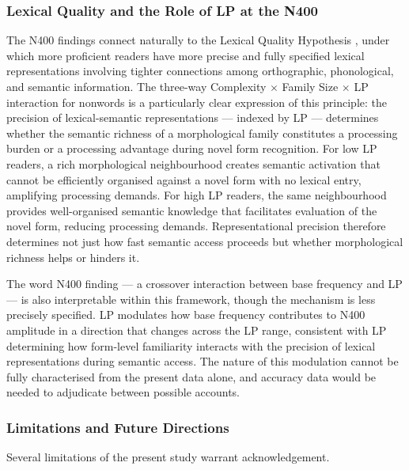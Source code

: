 \documentclass[utf8]{FrontiersinHarvard} %
\begin{document}
	\subsubsection{Lexical Quality and the Role of LP at the N400}
	
	The N400 findings connect naturally to the Lexical Quality Hypothesis \citep{perfettiReadingAbilityLexical2007}, under which more proficient readers have more precise and fully specified lexical representations involving tighter connections among orthographic, phonological, and semantic information. The three-way Complexity $\times$ Family Size $\times$ LP interaction for nonwords is a particularly clear expression of this principle: the precision of lexical-semantic representations --- indexed by LP --- determines whether the semantic richness of a morphological family constitutes a processing burden or a processing advantage during novel form recognition. For low LP readers, a rich morphological neighbourhood creates semantic activation that cannot be efficiently organised against a novel form with no lexical entry, amplifying processing demands. For high LP readers, the same neighbourhood provides well-organised semantic knowledge that facilitates evaluation of the novel form, reducing processing demands. Representational precision therefore determines not just how fast semantic access proceeds but whether morphological richness helps or hinders it.
	
	The word N400 finding --- a crossover interaction between base frequency and LP --- is also interpretable within this framework, though the mechanism is less precisely specified. LP modulates how base frequency contributes to N400 amplitude in a direction that changes across the LP range, consistent with LP determining how form-level familiarity interacts with the precision of lexical representations during semantic access. The nature of this modulation cannot be fully characterised from the present data alone, and accuracy data would be needed to adjudicate between possible accounts.
	
	\subsubsection{Limitations and Future Directions}
	
	Several limitations of the present study warrant acknowledgement.
	
\end{document}
